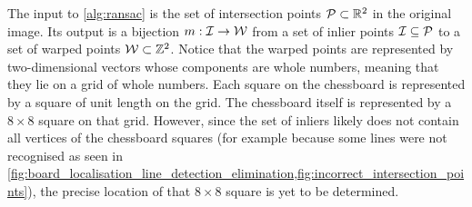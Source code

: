 \documentclass[../report.tex]{subfiles}
\begin{document}
The input to \cref{alg:ransac} is the set of intersection points ${\mathcal{P}} \subset \mathbb{R}^2$ in the original image.
Its output is a bijection $m : {\mathcal{I}} \to {\mathcal{W}}$ from a set of inlier points ${\mathcal{I}} \subseteq {\mathcal{P}}$ to a set of warped points ${\mathcal{W}} \subset \mathbb{Z}^2$. 
Notice that the warped points are represented by two-dimensional vectors whose components are whole numbers, meaning that they lie on a grid of whole numbers.
Each square on the chessboard is represented by a square of unit length on the grid.
The chessboard itself is represented by a $8 \times 8$ square on that grid.
However, since the set of inliers likely does not contain all vertices of the chessboard squares (for example because some lines were not recognised as seen in \cref{fig:board_localisation_line_detection_elimination,fig:incorrect_intersection_points}), the precise location of that $8 \times 8$ square is yet to be determined.
\end{document}
